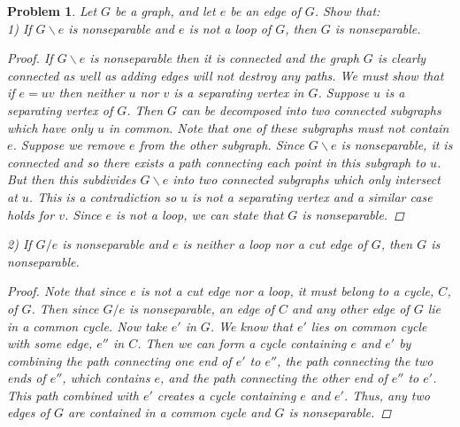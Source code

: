 \documentclass{article}
\newtheorem{problem}{Problem}
\begin{document}
\begin{flushleft}
\begin{problem}
Let $G$ be a graph, and let $e$ be an edge of $G$. Show that:\\
1) If $G \backslash e$ is nonseparable and $e$ is not a loop of $G$, then $G$ is nonseparable.
\begin{proof}
If $G \backslash e$ is nonseparable then it is connected and the graph $G$ is clearly connected as well as adding edges will not destroy any paths. We must show that if $e = uv$ then neither $u$ nor $v$ is a separating vertex in $G$. Suppose $u$ is a separating vertex of $G$. Then $G$ can be decomposed into two connected subgraphs which have only $u$ in common. Note that one of these subgraphs must not contain $e$. Suppose we remove $e$ from the other subgraph. Since $G \backslash e$ is nonseparable, it is connected and so there exists a path connecting each point in this subgraph to $u$. But then this subdivides $G \backslash e$ into two connected subgraphs which only intersect at $u$. This is a contradiction so $u$ is not a separating vertex and a similar case holds for $v$. Since $e$ is not a loop, we can state that $G$ is nonseparable.
\end{proof}
2) If $G / e$ is nonseparable and $e$ is neither a loop nor a cut edge of $G$, then $G$ is nonseparable.
\begin{proof}
Note that since $e$ is not a cut edge nor a loop, it must belong to a cycle, $C$, of $G$. Then since $G / e$ is nonseparable, an edge of $C$ and any other edge of $G$ lie in a common cycle. Now take $e'$ in $G$. We know that $e'$ lies on common cycle with some edge, $e''$ in $C$. Then we can form a cycle containing $e$ and $e'$ by combining the path connecting one end of $e'$ to $e''$, the path connecting the two ends of $e''$, which contains $e$, and the path connecting the other end of $e''$ to $e'$. This path combined with $e'$ creates a cycle containing $e$ and $e'$. Thus, any two edges of $G$ are contained in a common cycle and $G$ is nonseparable.
\end{proof}
\end{problem}


\end{flushleft}
\end{document}

